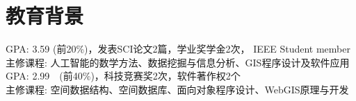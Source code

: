 \documentclass{resume}
\begin{document}




\section{教育背景}
{\small GPA: 3.59 (前20\%)，发表SCI论文2篇，学业奖学金2次， IEEE Student member\\
  主修课程: 人工智能的数学方法、数据挖掘与信息分析、GIS程序设计及软件应用}
\vspace{0.1cm}
{\small GPA: 2.99~~(前40\%)，科技竞赛奖2次，软件著作权2个\\
  主修课程: 空间数据结构、空间数据库、面向对象程序设计、WebGIS原理与开发}

\end{document}
